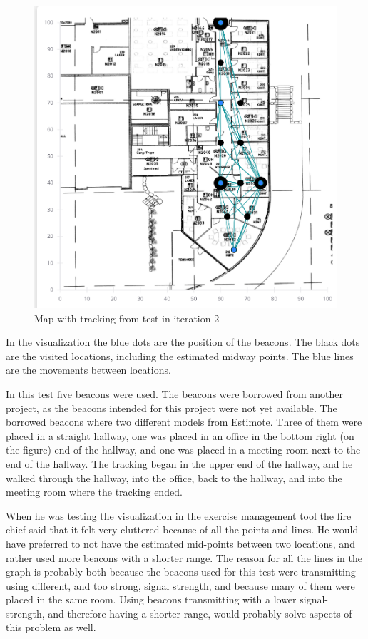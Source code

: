 \documentclass[../Main/thesis.tex]{subfiles}
\begin{document}
\begin{figure}[h]
	\centering
	\includegraphics[width=\textwidth]{../fig/iteration2-map}
	\caption{Map with tracking from test in iteration 2}
	\label{fig:iteration2-map}
\end{figure}

In the visualization the blue dots are the position of the beacons.
The black dots are the visited locations, including the estimated midway points.
The blue lines are the movements between locations.

In this test five beacons were used. 
The beacons were borrowed from another project, as the beacons intended for this project were not yet available.
The borrowed beacons where two different models from Estimote.
Three of them were placed in a straight hallway, one was placed in an office in the bottom right (on the figure) end of the hallway, and one was placed in a meeting room next to the end of the hallway.
The tracking began in the upper end of the hallway, and he walked through the hallway, into the office, back to the hallway, and into the meeting room where the tracking ended.

When he was testing the visualization in the exercise management tool the fire chief said that it felt very cluttered because of all the points and lines.
He would have preferred to not have the estimated mid-points between two locations, and rather used more beacons with a shorter range.
The reason for all the lines in the graph is probably both because the beacons used for this test were transmitting using different, and too strong, signal strength, and because many of them were placed in the same room.
Using beacons transmitting with a lower signal-strength, and therefore having a shorter range, would probably solve aspects of this problem as well.
\end{document}

